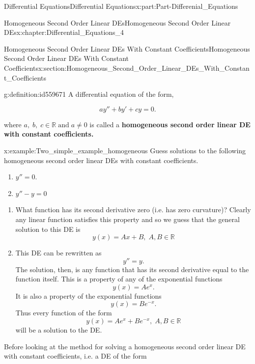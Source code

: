 \documentclass[oneside,10pt,]{book}
\newcommand{\terminology}[1]{\textbf{#1}}
\numberwithin{equation}{section}
\begin{document}
\begin{partptx}{Differential Equations}{}{Differential Equations}{}{}{x:part:Part-Differenial_Equations}
\begin{chapterptx}{Homogeneous Second Order Linear DEs}{}{Homogeneous Second Order Linear DEs}{}{}{x:chapter:Differential_Equations_4}
\begin{sectionptx}{Homogeneous Second Order Linear DEs With Constant Coefficients}{}{Homogeneous Second Order Linear DEs With Constant Coefficients}{}{}{x:section:Homogeneous_Second_Order_Linear_DEs_With_Constant_Coefficients}
\begin{definition}{}{g:definition:id559671}
A differential equation of the form,%
\par
%
\begin{equation*}
ay''+by'+cy=0 \text{.}
\end{equation*}
%
\par
where  \(a,\; b, \; c \in \mathbb{R} \; \text{and}\; a\neq 0 \) is called a \terminology{homogeneous second order linear DE with constant coefficients.}%
\end{definition}
\begin{example}{}{x:example:Two_simple_example_homogeneous}%
Guess solutions to the following homogeneous second order linear DEs with constant coefficients.%
\par
%
\begin{enumerate}[label=\alph*]
\item{}\(\displaystyle y''=0. \)%
\item{}\(\displaystyle y''-y=0 \)%
\end{enumerate}
%
\par
%
\begin{enumerate}[label=\alph*]
\item{}What function has its second derivative zero (i.e. has zero curvature)? Clearly any linear function satisfies this property and so we guess that the general solution to this DE is%
\begin{equation*}
y(x)=Ax+B, \; A,B\in \mathbb{R} 
\end{equation*}
%
\item{}This DE can be rewritten as%
\begin{equation*}
y''=y. 
\end{equation*}
The solution, then, is any function that has its second derivative equal to the function itself. This is a property of any of the exponential functions%
\begin{equation*}
y(x)=Ae^{x}. 
\end{equation*}
It is also a property of the exponential functions%
\begin{equation*}
y(x)=Be^{-x}. 
\end{equation*}
Thus every function of the form%
\begin{equation*}
y(x)=Ae^{x}+Be^{-x}, \; A,B\in \mathbb{R} 
\end{equation*}
will be a solution to the DE.%
\end{enumerate}
%
\end{example}
Before looking at the method for solving a homogeneous second order linear DE with constant coefficients, i.e. a DE of the form%

\end{sectionptx}
\end{chapterptx}
\end{partptx}
\end{document}
